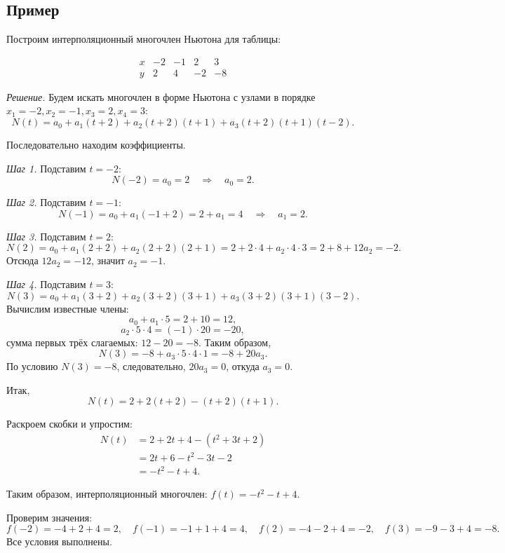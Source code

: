\documentclass[a4paper,12pt]{article}
\theoremstyle{definition}
\theoremstyle{plain}
\theoremstyle{remark}
\begin{document}
	\subsection{Пример}
	
	Построим интерполяционный многочлен Ньютона для таблицы:
	
	\[
	\begin{array}{c|cccc}
		x & -2 & -1 & 2 & 3 \\
		\hline
		y & 2 & 4 & -2 & -8
	\end{array}
	\]
	
	\textit{Решение.} Будем искать многочлен в форме Ньютона с узлами в порядке \( x_1 = -2, x_2 = -1, x_3 = 2, x_4 = 3 \):
	\[
	N(t) = a_0 + a_1(t + 2) + a_2(t + 2)(t + 1) + a_3(t + 2)(t + 1)(t - 2).
	\]
	
	Последовательно находим коэффициенты.
	
	\textit{Шаг 1.} Подставим \( t = -2 \):
	\[
	N(-2) = a_0 = 2 \quad \Rightarrow \quad a_0 = 2.
	\]
	
	\textit{Шаг 2.} Подставим \( t = -1 \):
	\[
	N(-1) = a_0 + a_1(-1 + 2) = 2 + a_1 = 4 \quad \Rightarrow \quad a_1 = 2.
	\]
	
	\textit{Шаг 3.} Подставим \( t = 2 \):
	\[
	N(2) = a_0 + a_1(2 + 2) + a_2(2 + 2)(2 + 1) = 2 + 2 \cdot 4 + a_2 \cdot 4 \cdot 3 = 2 + 8 + 12a_2 = -2.
	\]
	Отсюда \( 12a_2 = -12 \), значит \( a_2 = -1 \).
	
	\textit{Шаг 4.} Подставим \( t = 3 \):
	\[
	N(3) = a_0 + a_1(3 + 2) + a_2(3 + 2)(3 + 1) + a_3(3 + 2)(3 + 1)(3 - 2).
	\]
	Вычислим известные члены:
	\[
	a_0 + a_1 \cdot 5 = 2 + 10 = 12,
	\]
	\[
	a_2 \cdot 5 \cdot 4 = (-1) \cdot 20 = -20,
	\]
	сумма первых трёх слагаемых: \( 12 - 20 = -8 \).
	Таким образом,
	\[
	N(3) = -8 + a_3 \cdot 5 \cdot 4 \cdot 1 = -8 + 20a_3.
	\]
	По условию \( N(3) = -8 \), следовательно, \( 20a_3 = 0 \), откуда \( a_3 = 0 \).
	
	Итак,
	\[
	N(t) = 2 + 2(t + 2) - (t + 2)(t + 1).
	\]
	
	Раскроем скобки и упростим:
	\[
	\begin{aligned}
		N(t) &= 2 + 2t + 4 - (t^2 + 3t + 2) \\
		&= 2t + 6 - t^2 - 3t - 2 \\
		&= -t^2 - t + 4.
	\end{aligned}
	\]
	
	Таким образом, интерполяционный многочлен: \( f(t) = -t^2 - t + 4 \).
	
	Проверим значения:
	\[
	f(-2) = -4 + 2 + 4 = 2, \quad f(-1) = -1 + 1 + 4 = 4, \quad f(2) = -4 - 2 + 4 = -2, \quad f(3) = -9 - 3 + 4 = -8.
	\]
	Все условия выполнены.
	
\end{document}
